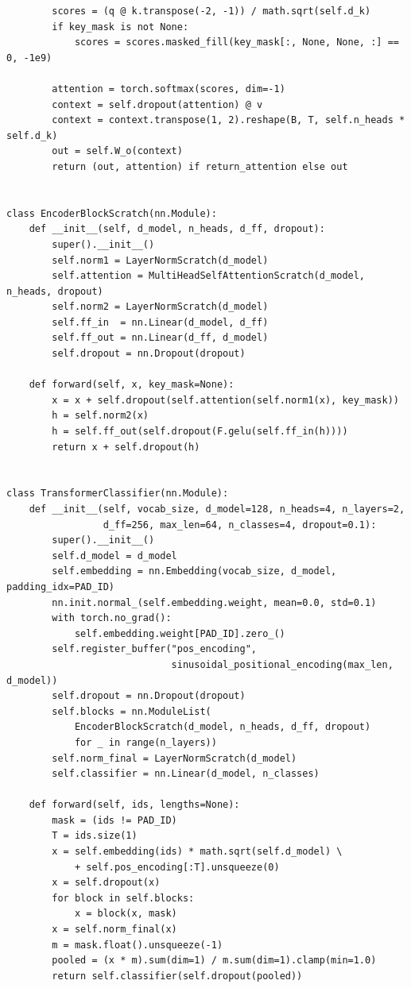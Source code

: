{\begin{verbatim}
        scores = (q @ k.transpose(-2, -1)) / math.sqrt(self.d_k)
        if key_mask is not None:
            scores = scores.masked_fill(key_mask[:, None, None, :] == 0, -1e9)

        attention = torch.softmax(scores, dim=-1)
        context = self.dropout(attention) @ v
        context = context.transpose(1, 2).reshape(B, T, self.n_heads * self.d_k)
        out = self.W_o(context)
        return (out, attention) if return_attention else out


class EncoderBlockScratch(nn.Module):
    def __init__(self, d_model, n_heads, d_ff, dropout):
        super().__init__()
        self.norm1 = LayerNormScratch(d_model)
        self.attention = MultiHeadSelfAttentionScratch(d_model, n_heads, dropout)
        self.norm2 = LayerNormScratch(d_model)
        self.ff_in  = nn.Linear(d_model, d_ff)
        self.ff_out = nn.Linear(d_ff, d_model)
        self.dropout = nn.Dropout(dropout)

    def forward(self, x, key_mask=None):
        x = x + self.dropout(self.attention(self.norm1(x), key_mask))
        h = self.norm2(x)
        h = self.ff_out(self.dropout(F.gelu(self.ff_in(h))))
        return x + self.dropout(h)


class TransformerClassifier(nn.Module):
    def __init__(self, vocab_size, d_model=128, n_heads=4, n_layers=2,
                 d_ff=256, max_len=64, n_classes=4, dropout=0.1):
        super().__init__()
        self.d_model = d_model
        self.embedding = nn.Embedding(vocab_size, d_model, padding_idx=PAD_ID)
        nn.init.normal_(self.embedding.weight, mean=0.0, std=0.1)
        with torch.no_grad():
            self.embedding.weight[PAD_ID].zero_()
        self.register_buffer("pos_encoding",
                             sinusoidal_positional_encoding(max_len, d_model))
        self.dropout = nn.Dropout(dropout)
        self.blocks = nn.ModuleList(
            EncoderBlockScratch(d_model, n_heads, d_ff, dropout)
            for _ in range(n_layers))
        self.norm_final = LayerNormScratch(d_model)
        self.classifier = nn.Linear(d_model, n_classes)

    def forward(self, ids, lengths=None):
        mask = (ids != PAD_ID)
        T = ids.size(1)
        x = self.embedding(ids) * math.sqrt(self.d_model) \
            + self.pos_encoding[:T].unsqueeze(0)
        x = self.dropout(x)
        for block in self.blocks:
            x = block(x, mask)
        x = self.norm_final(x)
        m = mask.float().unsqueeze(-1)
        pooled = (x * m).sum(dim=1) / m.sum(dim=1).clamp(min=1.0)
        return self.classifier(self.dropout(pooled))
\end{verbatim}}

